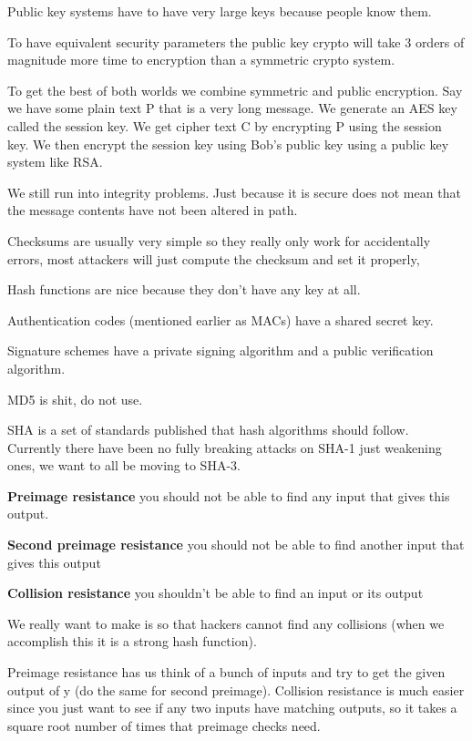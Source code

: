 \documentclass{article}
\begin{document}

Public key systems have to have very large keys because people know them.


To have equivalent security parameters the public key crypto will take 3 orders of magnitude more time to encryption than a symmetric crypto system.


To get the best of both worlds we combine symmetric and public encryption. Say we have some plain text P that is a very long message. We generate an AES key called the session key. We get cipher text C by encrypting P using the session key. We then encrypt the session key using Bob's public key  using a public key system like RSA. 


We still run into integrity problems. Just because it is secure does not mean that the message contents have not been altered in path.




Checksums are usually very simple so they really only work for accidentally errors, most attackers will just compute the checksum and set it properly,

Hash functions are nice because they don't have any key at all.

Authentication codes (mentioned earlier as MACs) have a shared secret key.

Signature schemes have a private signing algorithm and a public verification algorithm.


MD5 is shit, do not use.

SHA is a set of standards published that hash algorithms should follow. Currently there have been no fully breaking attacks on SHA-1 just weakening ones, we want to all be moving to SHA-3.

\textbf{Preimage resistance} you should not be able to find any input that gives this output.

\textbf{Second preimage resistance} you should not be able to find another input that gives this output

\textbf{Collision resistance} you shouldn't be able to find an input or its output

We really want to make is so that hackers cannot find any collisions (when we accomplish this it is a strong hash function).



Preimage resistance has us think of a bunch of inputs and try to get the given output of y (do the same for second preimage). Collision resistance is much easier since you just want to see if any two inputs have matching outputs, so it takes a square root number of times that preimage checks need.
\end{document}

